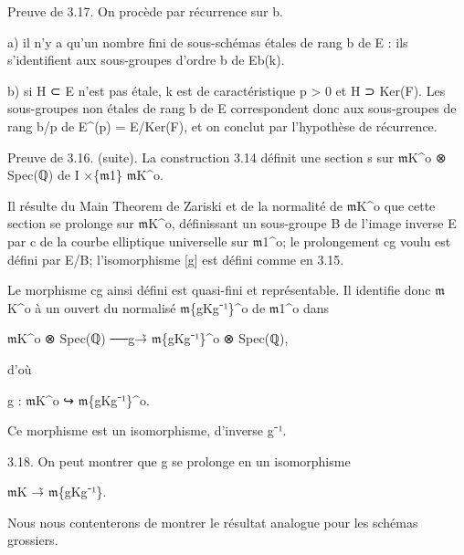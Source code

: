 \documentclass[11pt,a4paper]{article}
\begin{document}
Preuve de 3.17. On procède par récurrence sur b.

a) il n'y a qu'un nombre fini de sous-schémas étales de rang b de E : ils s'identifient aux sous-groupes d'ordre b de E\textunderscore{}b(k).

b) si H ⊂ E n'est pas étale, k est de caractéristique p > 0 et H ⊃ Ker(F). Les sous-groupes non étales de rang b de E correspondent donc aux sous-groupes de rang b/p de E\textasciicircum{}(p) = E/Ker(F), et on conclut par l'hypothèse de récurrence.

Preuve de 3.16. (suite). La construction 3.14 définit une section s sur \ensuremath{\mathfrak{m}}\textunderscore{}K\textasciicircum{}o ⊗ Spec(ℚ) de I ×\textunderscore{}\{\ensuremath{\mathfrak{m}}\textunderscore{}1\} \ensuremath{\mathfrak{m}}\textunderscore{}K\textasciicircum{}o.

Il résulte du Main Theorem de Zariski et de la normalité de \ensuremath{\mathfrak{m}}\textunderscore{}K\textasciicircum{}o que cette section se prolonge sur \ensuremath{\mathfrak{m}}\textunderscore{}K\textasciicircum{}o, définissant un sous-groupe B de l'image inverse E par c de la courbe elliptique universelle sur \ensuremath{\mathfrak{m}}\textunderscore{}1\textasciicircum{}o; le prolongement cg voulu est défini par E/B; l'isomorphisme [g] est défini comme en 3.15.

Le morphisme cg ainsi défini est quasi-fini et représentable. Il identifie donc \ensuremath{\mathfrak{m}}\textunderscore{}K\textasciicircum{}o à un ouvert du normalisé \ensuremath{\mathfrak{m}}\textunderscore{}\{gKg⁻¹\}\textasciicircum{}o de \ensuremath{\mathfrak{m}}\textunderscore{}1\textasciicircum{}o dans

\ensuremath{\mathfrak{m}}\textunderscore{}K\textasciicircum{}o ⊗ Spec(ℚ) ──g→̃ \ensuremath{\mathfrak{m}}\textunderscore{}\{gKg⁻¹\}\textasciicircum{}o ⊗ Spec(ℚ),

d'où

g : \ensuremath{\mathfrak{m}}\textunderscore{}K\textasciicircum{}o ↪ \ensuremath{\mathfrak{m}}\textunderscore{}\{gKg⁻¹\}\textasciicircum{}o.

Ce morphisme est un isomorphisme, d'inverse g⁻¹.

3.18. On peut montrer que g se prolonge en un isomorphisme

\ensuremath{\mathfrak{m}}\textunderscore{}K →̃ \ensuremath{\mathfrak{m}}\textunderscore{}\{gKg⁻¹\}.

Nous nous contenterons de montrer le résultat analogue pour les schémas grossiers.
\end{document}

